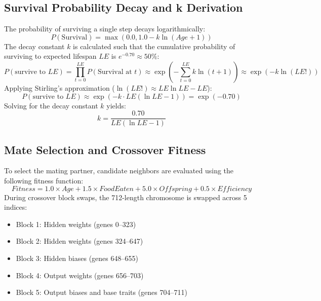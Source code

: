 \documentclass[11pt,a4paper]{article}
\begin{document}
\subsection{Survival Probability Decay and k Derivation}
The probability of surviving a single step decays logarithmically:
\begin{equation}
    P(\text{Survival}) = \max\left(0.0, 1.0 - k \ln(Age + 1)\right)
\end{equation}
The decay constant $k$ is calculated such that the cumulative probability of surviving to expected lifespan $LE$ is $e^{-0.70} \approx 50\%$:
\begin{equation}
    P(\text{survive to } LE) = \prod_{t=0}^{LE} P(\text{Survival at } t) \approx \exp\left(-\sum_{t=0}^{LE} k \ln(t+1)\right) \approx \exp(-k \ln(LE!))
\end{equation}
Applying Stirling's approximation ($\ln(LE!) \approx LE \ln LE - LE$):
\begin{equation}
    P(\text{survive to } LE) \approx \exp\left(-k \cdot LE(\ln LE - 1)\right) = \exp(-0.70)
\end{equation}
Solving for the decay constant $k$ yields:
\begin{equation}
    k = \frac{0.70}{LE(\ln LE - 1)}
\end{equation}

\subsection{Mate Selection and Crossover Fitness}
To select the mating partner, candidate neighbors are evaluated using the following fitness function:
\begin{equation}
    Fitness = 1.0 \times Age + 1.5 \times FoodEaten + 5.0 \times Offspring + 0.5 \times Efficiency
\end{equation}
During crossover block swaps, the 712-length chromosome is swapped across 5 indices:
\begin{itemize}
    \item Block 1: Hidden weights (genes 0--323)
    \item Block 2: Hidden weights (genes 324--647)
    \item Block 3: Hidden biases (genes 648--655)
    \item Block 4: Output weights (genes 656--703)
    \item Block 5: Output biases and base traits (genes 704--711)
\end{itemize}
\end{document}

